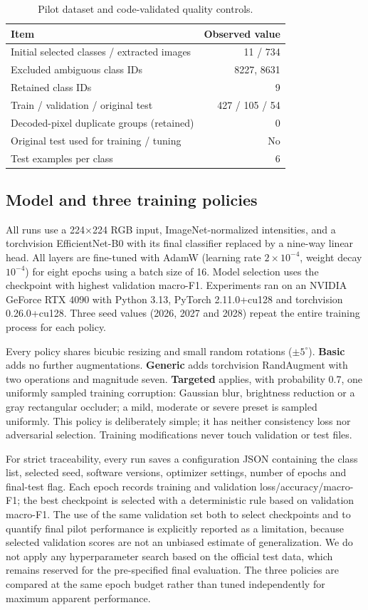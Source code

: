 \documentclass[sigconf,nonacm]{acmart}
\begin{document}
\begin{table}[t]
\caption{Pilot dataset and code-validated quality controls.}
\label{tab:data}
\small
\begin{tabular}{p{}r}
\toprule
Item & Observed value\\
\midrule
Initial selected classes / extracted images & 11 / 734\\
Excluded ambiguous class IDs & 8227, 8631\\
Retained class IDs & 9\\
Train / validation / original test & 427 / 105 / 54\\
Decoded-pixel duplicate groups (retained) & 0\\
Original test used for training / tuning & No\\
Test examples per class & 6\\
\bottomrule
\end{tabular}
\end{table}

\subsection{Model and three training policies}
All runs use a 224$\times$224 RGB input, ImageNet-normalized intensities, and a torchvision EfficientNet-B0 with its final classifier replaced by a nine-way linear head. All layers are fine-tuned with AdamW (learning rate $2\times10^{-4}$, weight decay $10^{-4}$) for eight epochs using a batch size of 16. Model selection uses the checkpoint with highest validation macro-F1. Experiments ran on an NVIDIA GeForce RTX 4090 with Python 3.13, PyTorch 2.11.0+cu128 and torchvision 0.26.0+cu128. Three seed values (2026, 2027 and 2028) repeat the entire training process for each policy.

Every policy shares bicubic resizing and small random rotations ($\pm5^{\circ}$). \textbf{Basic} adds no further augmentations. \textbf{Generic} adds torchvision RandAugment with two operations and magnitude seven. \textbf{Targeted} applies, with probability 0.7, one uniformly sampled training corruption: Gaussian blur, brightness reduction or a gray rectangular occluder; a mild, moderate or severe preset is sampled uniformly. This policy is deliberately simple; it has neither consistency loss nor adversarial selection. Training modifications never touch validation or test files.


For strict traceability, every run saves a configuration JSON containing the class list, selected seed, software versions, optimizer settings, number of epochs and final-test flag. Each epoch records training and validation loss/accuracy/macro-F1; the best checkpoint is selected with a deterministic rule based on validation macro-F1. The use of the same validation set both to select checkpoints and to quantify final pilot performance is explicitly reported as a limitation, because selected validation scores are not an unbiased estimate of generalization. We do not apply any hyperparameter search based on the official test data, which remains reserved for the pre-specified final evaluation. The three policies are compared at the same epoch budget rather than tuned independently for maximum apparent performance.
\end{document}
